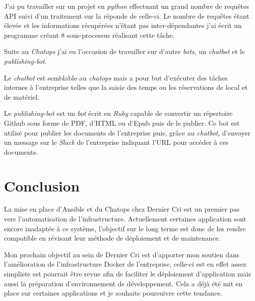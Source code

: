 \documentclass[12pt,a4paper]{article}
\begin{document}
  \bigskip

  J'ai pu travailler sur un projet en \emph{python} effectuant un grand
  nombre de requêtes API suivi d'un traitement sur la réponde de celle-ci.
  Le nombre de requêtes étant élevée et les informations récupérées
  n'étant pas inter-dépendantes j'ai écrit un programme créant 8
  sous-processus réalisant cette tâche.

  \bigskip

  Suite au \emph{Chatops} j'ai eu l'occasion de travailler sur d'autre
  \emph{bots}, un \emph{chatbot} et le \emph{publishing-bot}.

  \bigskip

  Le \emph{chatbot} est semblable au \emph{chatops} mais a pour but
  d'exécuter des tâches internes à l'entreprise telles que la saisie des
  temps ou les réservations de local et de matériel.

  \bigskip

  Le \emph{publishing-bot} est un \emph{bot} écrit en \emph{Ruby} capable
  de convertir un répertoire Github sous forme de PDF, d'HTML ou d'Epub
  puis de le publier. Ce bot est utilisé pour publier les documents de
  l'entreprise puis, grâce au \emph{chatbot}, d'envoyer un message sur le
  \emph{Slack} de l'entreprise indiquant l'URL pour accéder à ces
  documents.

  \newpage

  \section{Conclusion}\label{conclusion}

  \bigskip

  La mise en place d'Ansible et du Chatops chez Dernier Cri est un premier
  pas vers l'automatisation de l'infrastructure. Actuellement certaines
  application sont encore inadaptée à ce système, l'objectif sur le long
  terme est donc de les rendre compatible en révisant leur méthode de
  déploiement et de maintenance.

  \bigskip

  Mon prochain objectif au sein de Dernier Cri est d'apporter mon soutien
  dans l'amélioration de l'infrastructure Docker de l'entreprise, celle-ci
  est en effet assez simpliste est pourrait être revue afin de faciliter
  le déploiement d'application mais aussi la préparation d'environnement
  de développement. Cela a déjà été mit en place sur certaines
  applications et je souhaite poursuivre cette tendance.
\end{document}
